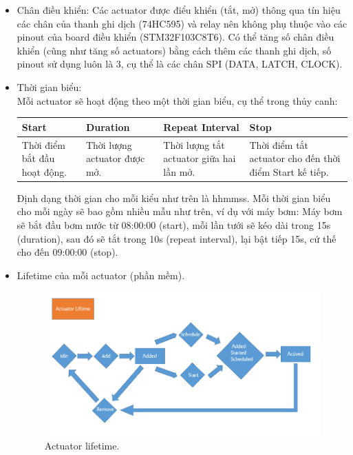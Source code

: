 \documentclass[a4paper,12pt,oneside]{article}
\begin{document}
\begin{itemize}
\item Chân điều khiển: Các actuator được điểu khiển (tắt, mở) thông qua tín hiệu các chân của thanh ghi dịch (74HC595) và relay nên không phụ thuộc vào các pinout của board điều khiển (STM32F103C8T6). Có thể tăng số chân điều khiển (cũng như tăng số actuators) bằng cách thêm các thanh ghi dịch, số pinout sử dụng luôn là 3, cụ thể là các chân SPI (DATA, LATCH, CLOCK).

\item Thời gian biểu:\\
Mỗi actuator sẽ hoạt động theo một thời gian biểu, cụ thể trong thủy canh:

\begin{center}
\begin{tabularx}{\linewidth}{ |X|X|X|X| }
\hline
Start & Duration & Repeat Interval & Stop\\
\hline
Thời điểm bắt đầu hoạt động. & Thời lượng actuator được mở. & Thời lượng tắt actuator giữa hai lần mở. & Thời điểm tắt actuator cho đến thời điểm Start kế tiếp.\\
\hline
\end{tabularx}
\end{center}

\noindent Định dạng thời gian cho mỗi kiểu như trên là hhmmss. Mỗi thời gian biểu cho mỗi ngày sẽ bao gồm nhiều mẫu như trên, ví dụ với máy bơm: Máy bơm sẽ bắt đầu bơm nước từ 08:00:00 (start), mỗi lần tưới sẽ kéo dài trong 15s (duration), sau đó sẽ tắt trong 10s (repeat interval), lại bật tiếp 15s, cứ thế cho đến 09:00:00 (stop).


\item Lifetime của mỗi actuator (phần mềm).
\begin{center}
\begin{figure}[h!]
\begin{center}
\includegraphics[scale=0.7]{hinh/actuator_lifetime.PNG}
\end{center}
\caption{Actuator lifetime.}
\end{figure}
\end{center}


\end{itemize}
\end{document}
